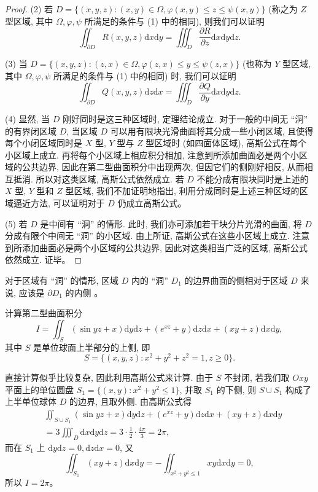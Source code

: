 \documentclass[UTF8,12pt,a4paper,fontset=fandol]{ctexart}
\begin{document}
\begin{proof}
(2) 若 $D=\{(x,y,z):(x,y)\in\Omega,\varphi(x,y)\leqslant z\leqslant\psi(x,y)\}$ (称之为 $Z$ 型区域, 其中 $\Omega,\varphi,\psi$ 所满足的条件与 (1) 中的相同), 则我们可以证明
\[
  \iint_{\partial D}R(x,y,z)\mathrm dx\mathrm dy
  =\iiint_D\frac{\partial R}{\partial z}\mathrm dx\mathrm dy\mathrm dz.
\]

(3) 当 $D=\{(x,y,z):(z,x)\in\Omega,\varphi(z,x)\leqslant y\leqslant\psi(z,x)\}$ (也称为 $Y$ 型区域, 其中 $\Omega,\varphi,\psi$ 所满足的条件与 (1) 中的相同) 时, 我们可以证明
\[
  \iint_{\partial D}Q(x,y,z)\mathrm dz\mathrm dx
  =\iiint_D\frac{\partial Q}{\partial y}\mathrm dx\mathrm dy\mathrm dz.
\]

(4) 显然, 当 $D$ 刚好同时是这三种区域时, 定理结论成立. 对于一般的中间无 ``洞'' 的有界闭区域 $D$, 当区域 $D$ 可以用有限块光滑曲面将其分成一些小闭区域, 且使得每个小闭区域同时是 $X$ 型, $Y$ 型与 $Z$ 型区域时 (如四面体区域), 高斯公式在每个小区域上成立. 再将每个小区域上相应积分相加, 注意到所添加曲面必是两个小区域的公共边界, 因此在第二型曲面积分中出现两次, 但因它们的侧刚好相反, 从而相互抵消. 所以对这类区域, 高斯公式依然成立. 若 $D$ 不能分成有限块同时是上述的 $X$ 型, $Y$ 型和 $Z$ 型区域, 我们不加证明地指出, 利用分成同时是上述三种区域的区域逼近方法, 可以证明对于 $D$ 仍成立高斯公式。

(5) 若 $D$ 是中间有 ``洞'' 的情形. 此时, 我们亦可添加若干块分片光滑的曲面, 将 $D$ 分成有限个中间无 ``洞'' 的小区域. 由上所证, 高斯公式在这些小区域上成立. 注意到所添加曲面必是两个小区域的公共边界, 因此对这类相当广泛的区域, 高斯公式依然成立. 证毕。

\end{proof}
\begin{remark}\quad 对于区域有 ``洞'' 的情形, 区域 $D$ 内的 ``洞'' $D_1$ 的边界曲面的侧相对于区域 $D$ 来说, 应该是 $\partial D_1$ 的内侧 。

\end{remark}
\begin{example}\label{course-example-16-5-3}\quad 计算第二型曲面积分
\[
  I=\iint_S(\sin yz+x)\mathrm dy\mathrm dz+(e^{xz}+y)\mathrm dz\mathrm dx+(xy+z)\mathrm dx\mathrm dy,
\]
其中 $S$ 是单位球面上半部分的上侧, 即
\[
  S=\{(x,y,z):x^2+y^2+z^2=1,z\geqslant0\}.
\]

\end{example}
\begin{solve}\quad 直接计算似乎比较复杂, 因此利用高斯公式来计算. 由于 $S$ 不封闭, 若我们取 $Oxy$ 平面上的单位圆盘 $S_1=\{(x,y):x^2+y^2\leqslant1\}$, 并取 $S_1$ 的下侧, 则 $S\cup S_1$ 构成了上半单位球体 $D$ 的边界, 且取外侧. 由高斯公式得
\[
\begin{aligned}
  &\iint_{S\cup S_1}(\sin yz+x)\mathrm dy\mathrm dz+(e^{xz}+y)\mathrm dz\mathrm dx+(xy+z)\mathrm dx\mathrm dy\\
  &=3\iiint_D\mathrm dx\mathrm dy\mathrm dz
    =3\cdot\frac12\cdot\frac{4\pi}{3}=2\pi,
\end{aligned}
\]
而在 $S_1$ 上 $\mathrm dy\mathrm dz=0,\mathrm dz\mathrm dx=0$, 又
\[
  \iint_{S_1}(xy+z)\mathrm dx\mathrm dy
  =-\iint_{x^2+y^2\leqslant1}xy\mathrm dx\mathrm dy=0,
\]
所以 $I=2\pi$。

\end{solve}
\end{document}
